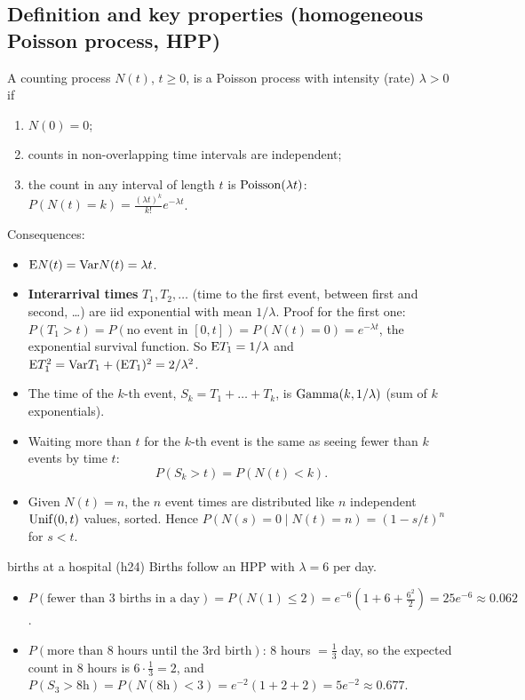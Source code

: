 \subsection{Definition and key properties (homogeneous Poisson process, HPP)}
A counting process $N(t)$, $t\ge 0$, is a Poisson process with intensity (rate) $\lambda>0$ if
\begin{enumerate}
  \item $N(0) = 0$;
  \item counts in non-overlapping time intervals are independent;
  \item the count in any interval of length $t$ is $\mathrm{Poisson}(\lambda t)$: $P(N(t)=k) = \frac{(\lambda t)^k}{k!}e^{-\lambda t}$.
\end{enumerate}
Consequences:
\begin{itemize}
  \item $\mathrm{E} N(t) = \mathrm{Var} N(t) = \lambda t$.
  \item \textbf{Interarrival times} $T_1, T_2,\dots$ (time to the first event, between first and second, \ldots) are iid exponential with mean $1/\lambda$. Proof for the first one: $P(T_1>t) = P(\text{no event in }[0,t]) = P(N(t)=0) = e^{-\lambda t}$, the exponential survival function. So $\mathrm{E} T_1 = 1/\lambda$ and $\mathrm{E} T_1^2 = \mathrm{Var} T_1 + (\mathrm{E} T_1)^2 = 2/\lambda^2$.
  \item The time of the $k$-th event, $S_k = T_1+\dots+T_k$, is $\mathrm{Gamma}(k, 1/\lambda)$ (sum of $k$ exponentials).
  \item Waiting more than $t$ for the $k$-th event is the same as seeing fewer than $k$ events by time $t$:
  \[
  P(S_k > t) = P(N(t) < k).
  \]
  \item Given $N(t) = n$, the $n$ event times are distributed like $n$ independent $\mathrm{Unif}(0,t)$ values, sorted. Hence $P(N(s)=0\mid N(t)=n) = (1-s/t)^n$ for $s<t$.
\end{itemize}

\begin{example}{births at a hospital (h24)}
Births follow an HPP with $\lambda = 6$ per day.
\begin{itemize}
  \item $P(\text{fewer than 3 births in a day}) = P(N(1)\le 2) = e^{-6}\left(1+6+\frac{6^2}{2}\right) = 25e^{-6}\approx 0.062$.
  \item $P(\text{more than 8 hours until the 3rd birth})$: 8 hours $=\frac13$ day, so the expected count in 8 hours is $6\cdot\frac13 = 2$, and $P(S_3>8\text{h}) = P(N(8\text{h})<3) = e^{-2}(1+2+2) = 5e^{-2}\approx 0.677$.
\end{itemize}
\end{example}


